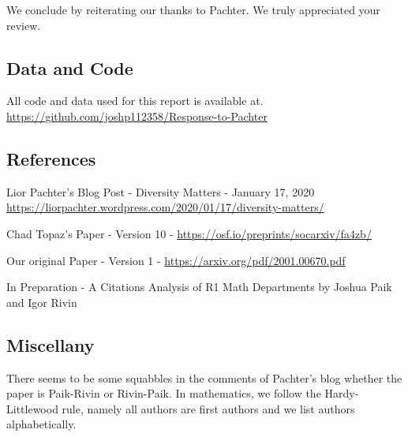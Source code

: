 \documentclass[]{article}
\begin{document}
We conclude by reiterating our thanks to Pachter. We truly appreciated
your review.

\hypertarget{data-and-code}{%
\subsection{Data and Code}\label{data-and-code}}

All code and data used for this report is available at.
\url{https://github.com/joshp112358/Response-to-Pachter}

\hypertarget{references}{%
\subsection{References}\label{references}}

Lior Pachter's Blog Post - Diversity Matters - January 17, 2020
\url{https://liorpachter.wordpress.com/2020/01/17/diversity-matters/}

Chad Topaz's Paper - Version 10 -
\url{https://osf.io/preprints/socarxiv/fa4zb/}

Our original Paper - Version 1 -
\url{https://arxiv.org/pdf/2001.00670.pdf}

In Preparation - A Citations Analysis of R1 Math Departments by Joshua
Paik and Igor Rivin

\hypertarget{miscellany}{%
\subsection{Miscellany}\label{miscellany}}

There seems to be some squabbles in the comments of Pachter's blog
whether the paper is Paik-Rivin or Rivin-Paik. In mathematics, we follow
the Hardy-Littlewood rule, namely all authors are first authors and we
list authors alphabetically.
\end{document}
